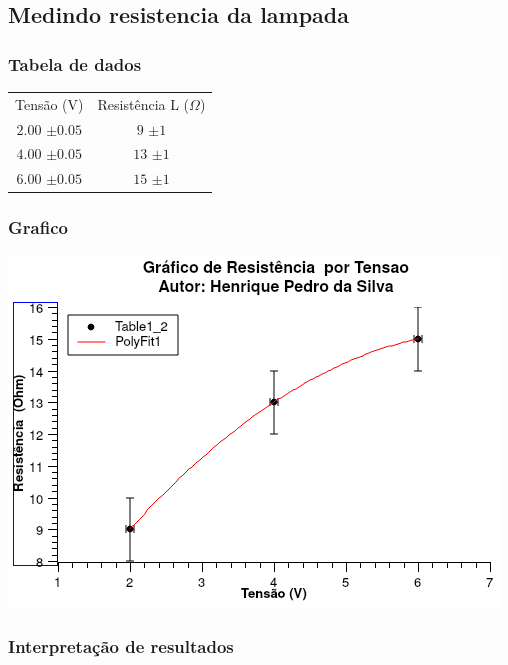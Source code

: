 \documentclass[12pt,twoside, a4paper, twocolumn]{article}
\begin{document}
\subsection{Medindo resistencia da lampada}

\subsubsection{Tabela de dados}

\begin{center}
    \begin{tabular}{ |cc| }
        \hline
        Tensão (V)       & Resistência L ($\varOmega$) \\
        $2.00$ $\pm0.05$ & $9$ $\pm1$                  \\
        $4.00$ $\pm0.05$ & $13$ $\pm1$                 \\
        $6.00$ $\pm0.05$ & $15$ $\pm1$                 \\
        \hline
    \end{tabular}
\end{center}

\subsubsection{Grafico}

\begin{adjustbox}{scale=0.70}
    \includegraphics{Graph2.png}
\end{adjustbox}

\subsubsection{Interpretação de resultados}
\end{document}

